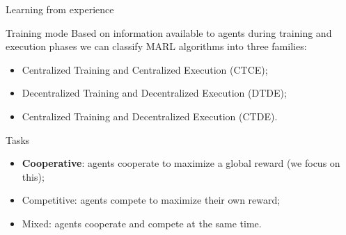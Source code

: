 \documentclass[presentation]{beamer}\mode<presentation>{\usetheme{AMSBolognaFC}}
\begin{document}
\begin{frame}[allowframebreaks]{Learning from experience}
\begin{alertblock}{Training mode}
	Based on information available to agents during training and execution phases we can classify 
		MARL algorithms into three families:
	\begin{itemize}
		\item Centralized Training and Centralized Execution (CTCE);
		\item Decentralized Training and Decentralized Execution (DTDE);
		\item Centralized Training and Decentralized Execution (CTDE).
	\end{itemize}
\end{alertblock}

\begin{alertblock}{Tasks}
	\begin{itemize}
		\item \textbf{Cooperative}: agents cooperate to maximize a global reward (we focus on this);
		\item Competitive: agents compete to maximize their own reward;
		\item Mixed: agents cooperate and compete at the same time.
	\end{itemize}
\end{alertblock}

\end{frame}
\end{document}

